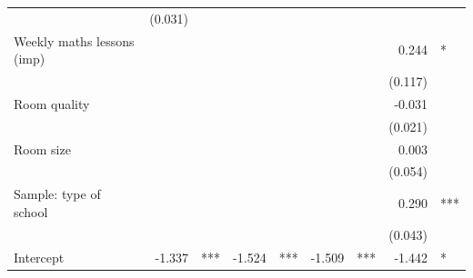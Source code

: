 \documentclass{article}
\begin{document}
\begin{table}[!h]
\begin{tabular}{lllllllll}
  \multicolumn{1}{l}{} &
  \multicolumn{1}{r}{(0.031)} &
  \multicolumn{1}{l}{} \\
\multicolumn{1}{l}{Weekly maths lessons (imp)} &
  \multicolumn{1}{r}{} &
  \multicolumn{1}{l}{} &
  \multicolumn{1}{r}{} &
  \multicolumn{1}{l}{} &
  \multicolumn{1}{r}{} &
  \multicolumn{1}{l}{} &
  \multicolumn{1}{r}{0.244} &
  \multicolumn{1}{l}{*} \\
\multicolumn{1}{l}{} &
  \multicolumn{1}{r}{} &
  \multicolumn{1}{l}{} &
  \multicolumn{1}{r}{} &
  \multicolumn{1}{l}{} &
  \multicolumn{1}{r}{} &
  \multicolumn{1}{l}{} &
  \multicolumn{1}{r}{(0.117)} &
  \multicolumn{1}{l}{} \\
\multicolumn{1}{l}{Room quality} &
  \multicolumn{1}{r}{} &
  \multicolumn{1}{l}{} &
  \multicolumn{1}{r}{} &
  \multicolumn{1}{l}{} &
  \multicolumn{1}{r}{} &
  \multicolumn{1}{l}{} &
  \multicolumn{1}{r}{-0.031} &
  \multicolumn{1}{l}{} \\
\multicolumn{1}{l}{} &
  \multicolumn{1}{r}{} &
  \multicolumn{1}{l}{} &
  \multicolumn{1}{r}{} &
  \multicolumn{1}{l}{} &
  \multicolumn{1}{r}{} &
  \multicolumn{1}{l}{} &
  \multicolumn{1}{r}{(0.021)} &
  \multicolumn{1}{l}{} \\
\multicolumn{1}{l}{Room size} &
  \multicolumn{1}{r}{} &
  \multicolumn{1}{l}{} &
  \multicolumn{1}{r}{} &
  \multicolumn{1}{l}{} &
  \multicolumn{1}{r}{} &
  \multicolumn{1}{l}{} &
  \multicolumn{1}{r}{0.003} &
  \multicolumn{1}{l}{} \\
\multicolumn{1}{l}{} &
  \multicolumn{1}{r}{} &
  \multicolumn{1}{l}{} &
  \multicolumn{1}{r}{} &
  \multicolumn{1}{l}{} &
  \multicolumn{1}{r}{} &
  \multicolumn{1}{l}{} &
  \multicolumn{1}{r}{(0.054)} &
  \multicolumn{1}{l}{} \\
\multicolumn{1}{l}{Sample: type of school} &
  \multicolumn{1}{r}{} &
  \multicolumn{1}{l}{} &
  \multicolumn{1}{r}{} &
  \multicolumn{1}{l}{} &
  \multicolumn{1}{r}{} &
  \multicolumn{1}{l}{} &
  \multicolumn{1}{r}{0.290} &
  \multicolumn{1}{l}{***} \\
\multicolumn{1}{l}{} &
  \multicolumn{1}{r}{} &
  \multicolumn{1}{l}{} &
  \multicolumn{1}{r}{} &
  \multicolumn{1}{l}{} &
  \multicolumn{1}{r}{} &
  \multicolumn{1}{l}{} &
  \multicolumn{1}{r}{(0.043)} &
  \multicolumn{1}{l}{} \\
\multicolumn{1}{l}{Intercept} &
  \multicolumn{1}{r}{-1.337} &
  \multicolumn{1}{l}{***} &
  \multicolumn{1}{r}{-1.524} &
  \multicolumn{1}{l}{***} &
  \multicolumn{1}{r}{-1.509} &
  \multicolumn{1}{l}{***} &
  \multicolumn{1}{r}{-1.442} &
  \multicolumn{1}{l}{*} \\

\end{tabular}
\end{table}
\end{document}
